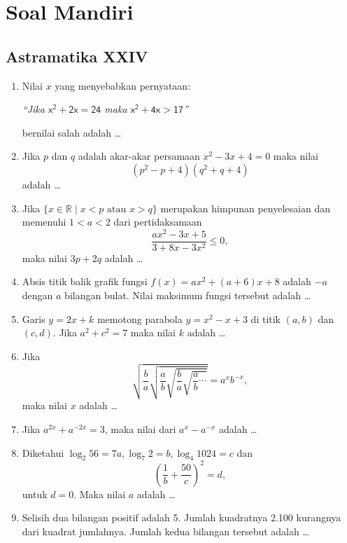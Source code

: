 \chapter{Soal Mandiri}
\section{Astramatika XXIV}

\begin{enumerate}

\item Nilai $x$ yang menyebabkan pernyataan:
	\begin{center}
	\emph{\sffamily ``Jika ${\mathsf{x}^\mathsf{2}+\mathsf{2}\mathsf{x} = \mathsf{24}}$ maka ${\mathsf{x}^\mathsf{2}+\mathsf{4}\mathsf{x}>\mathsf{17}}$''}
	\end{center}
bernilai salah adalah \ldots

\item Jika $p$ dan $q$ adalah akar-akar persamaan $x^2-3x+4 = 0$ maka nilai \[(p^2-p+4)(q^2+q+4)\] adalah \ldots

\item Jika $\{x\in\mathbb{R} \mid x<p \textrm{ atau } x>q\}$ merupakan himpunan penyelesaian dan memenuhi $1<a<2$ dari pertidaksamaan \[\frac{ax^2-3x+5}{3+8x-3x^2}\leq 0,\]maka nilai $3p+2q$ adalah \ldots

\item Absis titik balik grafik fungsi $f(x) = ax^2 + (a+6)x + 8$ adalah $-a$ dengan $a$ bilangan bulat. Nilai maksimum fungsi tersebut adalah \ldots

\item Garis $y=2x+k$ memotong parabola $y=x^2-x+3$ di titik $(a,b)$ dan $(c,d)$. Jika $a^2+c^2 = 7$ maka nilai $k$ adalah \ldots

\item Jika \[\sqrt{\frac{b}{a}\sqrt{\frac{a}{b}\sqrt{\frac{b}{a}\sqrt{\frac{a}{b}\cdots}}}} = a^xb^{-x},\] maka nilai $x$ adalah \ldots

\item Jika $a^{2x} + a^{-2x} = 3$, maka nilai dari $a^x - a^{-x}$ adalah \ldots

\item Diketahui $\log_2 56 = 7a, \log_7 2 = b, \log_4 1024 = c$ dan \[\left(\frac{1}{b} + \frac{50}{c}\right)^2 = d,\] untuk $d=0$. Maka nilai $a$ adalah \ldots

\item Selisih dua bilangan positif adalah 5. Jumlah kuadratnya 2.100 kurangnya dari kuadrat jumlahnya. Jumlah kedua bilangan tersebut adalah \ldots


\end{enumerate}
